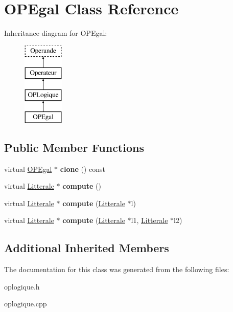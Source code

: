 \hypertarget{class_o_p_egal}{}\section{O\+P\+Egal Class Reference}
\label{class_o_p_egal}
Inheritance diagram for O\+P\+Egal\+:\begin{figure}[H]
\begin{center}
\leavevmode
\includegraphics[height=4.000000cm]{class_o_p_egal}
\end{center}
\end{figure}
\subsection*{Public Member Functions}
\begin{DoxyCompactItemize}
\item 
virtual \hyperlink{class_o_p_egal}{O\+P\+Egal} $\ast$ {\bfseries clone} () const \hypertarget{class_o_p_egal_a7e09ed34162cb2e56f6c6ee73662f564}{}\label{class_o_p_egal_a7e09ed34162cb2e56f6c6ee73662f564}

\item 
virtual \hyperlink{class_litterale}{Litterale} $\ast$ {\bfseries compute} ()\hypertarget{class_o_p_egal_a3303a6679e8353ef6517ca83344844f5}{}\label{class_o_p_egal_a3303a6679e8353ef6517ca83344844f5}

\item 
virtual \hyperlink{class_litterale}{Litterale} $\ast$ {\bfseries compute} (\hyperlink{class_litterale}{Litterale} $\ast$l)\hypertarget{class_o_p_egal_a2848159c99bef604362fbb580bb68e74}{}\label{class_o_p_egal_a2848159c99bef604362fbb580bb68e74}

\item 
virtual \hyperlink{class_litterale}{Litterale} $\ast$ {\bfseries compute} (\hyperlink{class_litterale}{Litterale} $\ast$l1, \hyperlink{class_litterale}{Litterale} $\ast$l2)\hypertarget{class_o_p_egal_adaf447809f230354de29788507db5dba}{}\label{class_o_p_egal_adaf447809f230354de29788507db5dba}

\end{DoxyCompactItemize}
\subsection*{Additional Inherited Members}


The documentation for this class was generated from the following files\+:\begin{DoxyCompactItemize}
\item 
oplogique.\+h\item 
oplogique.\+cpp\end{DoxyCompactItemize}
